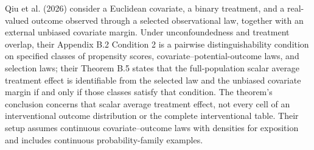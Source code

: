 Qiu et al. (2026) consider a Euclidean covariate, a binary treatment, and a real-valued outcome observed through a selected observational law, together with an external unbiased covariate margin. Under unconfoundedness and treatment overlap, their Appendix B.2 Condition 2 is a pairwise distinguishability condition on specified classes of propensity scores, covariate--potential-outcome laws, and selection laws; their Theorem B.5 states that the full-population scalar average treatment effect is identifiable from the selected law and the unbiased covariate margin if and only if those classes satisfy that condition. The theorem's conclusion concerns that scalar average treatment effect, not every cell of an interventional outcome distribution or the complete interventional table. Their setup assumes continuous covariate--outcome laws with densities for exposition and includes continuous probability-family examples.